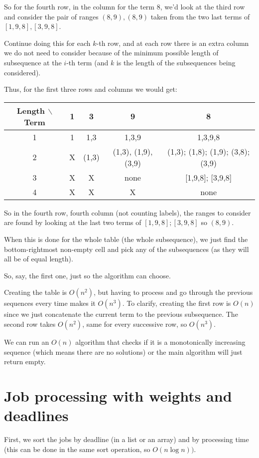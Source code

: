 \documentclass[11pt,letterpaper]{article}
\begin{document}
		So for the fourth row, in the column for the term 8, we'd look at the third row and consider the pair of ranges $(8,9), (8,9)$ taken from the two last terms of $[1,9,8], [3,9,8]$.
		
		Continue doing this for each $k$-th row, and at each row there is an extra column we do not need to consider because of the minimum possible length of subsequence at the $i$-th term (and $k$ is the length of the subsequences being considered).
		
		Thus, for the first three rows and columns we would get:
		
		\begin{tabular}{|c|c|c|c|c|}
			Length $\backslash$ Term & 1 & 3 & 9 & 8 \\ 
			\hline 
			1 & 1 & 1,3 & 1,3,9 & 1,3,9,8 \\ 
			\hline 
			2 & X & (1,3) & (1,3), (1,9), (3,9) & (1,3); (1,8); (1,9); (3,8); (3,9) \\ 
			\hline 
			3 & X & X & none & [1,9,8]; [3,9,8] \\ 
			\hline 
			4 & X & X & X & none \\ 
		\end{tabular}
		
		So in the fourth row, fourth column (not counting labels), the ranges to consider are found by looking at the last two terms of $[1,9,8]; [3,9,8]$ so $(8,9)$.
		
		When this is done for the whole table (the whole subsequence), we just find the bottom-rightmost non-empty cell and pick any of the subsequences (as they will all be of equal length).
		
		So, say, the first one, just so the algorithm can choose.
		
		Creating the table is $O(n^2)$, but having to process and go through the previous sequences every time makes it $O(n^3)$.
		To clarify, creating the first row is $O(n)$ since we just concatenate the current term to the previous subsequence.
		The second row takes $O(n^2)$, same for every successive row, so $O(n^3)$.
		
		We can run an $O(n)$ algorithm that checks if it is a monotonically increasing sequence (which means there are no solutions) or the main algorithm will just return empty.
	
	\section{Job processing with weights and deadlines}
		First, we sort the jobs by deadline (in a list or an array) and by processing time (this can be done in the same sort operation, so $O(n\log n))$.
		
\end{document}
